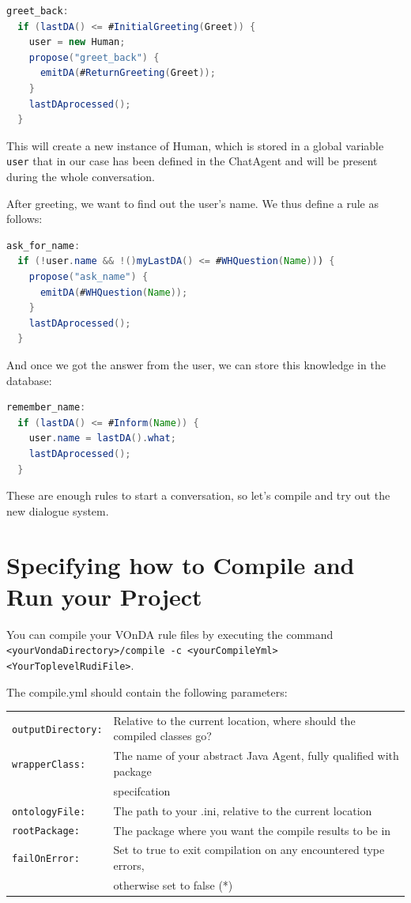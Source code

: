 \documentclass[a4paper]{report}
\newcommand{\vonda}{VOnDA\xspace}
\begin{document}
\begin{lstlisting}[language=Java]
greet_back:
  if (lastDA() <= #InitialGreeting(Greet)) {
    user = new Human;
    propose("greet_back") {
      emitDA(#ReturnGreeting(Greet));
    }
    lastDAprocessed();
  }
\end{lstlisting}

This will create a new instance of Human, which is stored in a global variable
\verb|user| that in our case has been defined in the ChatAgent and will be
present during the whole conversation.

After greeting, we want to find out the user's name. We thus define a rule as
follows:

\begin{lstlisting}[language=Java]
ask_for_name:
  if (!user.name && !()myLastDA() <= #WHQuestion(Name))) {
    propose("ask_name") {
      emitDA(#WHQuestion(Name));
    }
    lastDAprocessed();
  }
\end{lstlisting}

And once we got the answer from the user, we can store this knowledge in the database:

\begin{lstlisting}[language=Java]
remember_name:
  if (lastDA() <= #Inform(Name)) {
    user.name = lastDA().what;
    lastDAprocessed();
  }
\end{lstlisting}

These are enough rules to start a conversation, so let's compile and try out
the new dialogue system.

\section{Specifying how to Compile and Run your Project}

You can compile your \vonda rule files by executing the command\\ \verb|<yourVondaDirectory>/compile -c <yourCompileYml> <YourToplevelRudiFile>|.

The compile.yml should contain the following parameters:\\

\begin{tabular}{ll}
	\verb|outputDirectory:| & Relative to the current location, where should the compiled classes go?\\
	\verb|wrapperClass:| & The name of your abstract Java Agent, fully qualified with package \\&specifcation\\
	\verb|ontologyFile:| &The path to your .ini, relative to the current location\\
	\verb|rootPackage:| &The package where you want the compile results to be in\\
	\verb|failOnError:| &Set to true to exit compilation on any encountered type errors,\\& otherwise set to false (*)\\
\end{tabular}\newline
\end{document}
